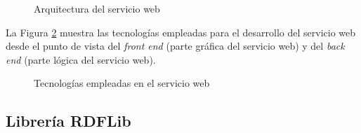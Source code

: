 \begin{figure}[!ht]
	\centering
    \caption{Arquitectura del servicio web}
    \label{arquitecturaServicio}
\end{figure}

La Figura \ref{tecnologiasServicio} muestra las tecnolog\'ias empleadas para el desarrollo del servicio web desde el punto de vista del \emph{front end} (parte gr\'afica del servicio web) y del \emph{back end} (parte l\'ogica del servicio web).

\begin{figure}[!ht]
	\centering
    \caption{Tecnolog\'ias empleadas en el servicio web}
    \label{tecnologiasServicio}
\end{figure}

\subsection{Librer\'ia RDFLib}

